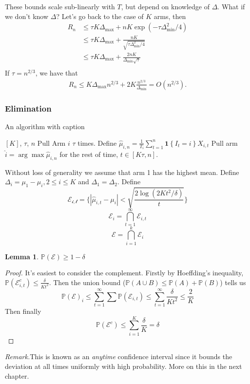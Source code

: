 \documentclass[11pt]{article}
\newtheorem{lemma}{Lemma}
\newcommand{\remark}{\noindent\textit{Remark.}}
\renewcommand{\P}{\mathbb{P}}
\newcommand{\mc}[1]{\mathcal{#1}}
\newcommand{\1}[1]{\mathbf{1}\left\{#1\right\}}
\begin{document}
 These bounds scale sub-linearly with $T$, but depend on knowledge of $\Delta$. What if we don't know $\Delta$? Let's go back to the case of $K$ arms, then 
 \begin{align*}
   R_n 
   &\leq \tau K\Delta_{\max} + n K\exp(-\tau\Delta_{\min}^2/4)  \\
   &\leq \tau K\Delta_{\max} + \frac{n K}{\sqrt{\tau\Delta_{\min}^2/4}} \\
   &\leq \tau K\Delta_{\max} + \frac{2n K}{\Delta_{\min}\sqrt{\tau}} \\
 \end{align*}
If $\tau = n^{2/3}$, we have that 
\begin{align*}
    R_n \leq K\Delta_{\max} n^{2/3} + 2K \frac{n^{2/3}}{\Delta_{\min}} = O(n^{2/3}).
\end{align*}


\subsubsection{Elimination}
\begin{algorithm}
\caption{An algorithm with caption}\label{alg:cap}
\begin{algorithmic}
\State $[K]$, $\tau$, $n$
    \State Pull Arm $i$ $\tau$ times. 
\EndFor
\State Define $\hat{\mu}_{i,n} = \frac{1}{T_i} \sum_{t=1}^n \1{I_t = i} X_{i,t}$
\State Pull arm $\hat{i} = \arg\max \hat{\mu}_{i,n}$ for the rest of time, $t\in [K\tau,n]$.
\end{algorithmic}
\end{algorithm}

Without loss of generality we assume that arm 1 has the highest mean. Define $\Delta_i = \mu_1 - \mu_i, 2\leq i\leq K$ and $\Delta_1 = \Delta_2$.
Define \[\mathcal{E_{i,t}} = \{|\hat{\mu}_{i,t} - \mu_i| < \sqrt{\frac{2\log(2Kt^2/\delta)}{t}}\}\]
\[\mathcal{E}_i = \bigcap_{t=1}^{\infty} \mathcal{E}_{i,t}\]
\[\mathcal{E} = \bigcap_{i=1}^{k} \mathcal{E}_{i}\]


\begin{lemma}
$\P(\mathcal{E}) \geq 1-\delta$
\end{lemma}
\begin{proof}
    It's easiest to consider the complement. Firstly by Hoeffding's inequality, $\P(\mc{E}_{i,t}^c) \leq \frac{\delta}{Kt^2}$. Then the union bound ($\P(A\cup B)\leq \P(A) + \P(B)$) tells us
    \[\P(\mc{E})_i\leq \sum_{t=1}^{\infty} \sum \P(\mc{E}_{i,t})\leq \sum_{t=1}^{\infty} \frac{\delta}{Kt^2}\leq \frac{2}{K}\]
    Then finally 
    \[\P(\mc{E}^c) \leq \sum_{i=1}^K \frac{\delta}{K} = \delta\]
\end{proof}
\remark This is known as an \textit{anytime} confidence interval since it bounds the deviation at all times uniformly with high probability. More on this in the next chapter.
\end{document}
